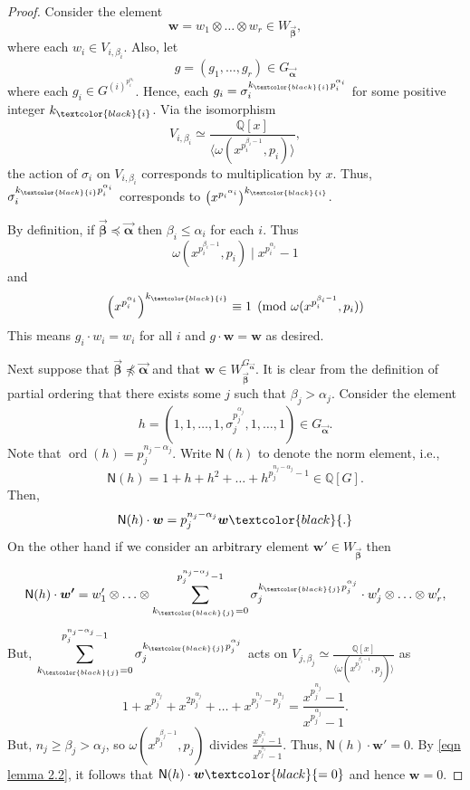 \documentclass{amsart}
\newcommand{\edit}[1]{\textcolor{black}{#1}}
\numberwithin{equation}{section}
\theoremstyle{remark}
\newcommand{\val}{\vec{\boldsymbol{\alpha}}}
\newcommand{\veb}{\vec{\boldsymbol{\beta}}}
\newcommand{\Q}{\mathbb{Q}}
\newcommand{\ord}{\operatorname{ord}}
\theoremstyle{plain} %
\begin{document}
\begin{proof}
Consider the element
\[
\boldsymbol{w} = w_1 \otimes \ldots \otimes w_r \in W_{\veb},
\]
where each $w_i \in V_{i, \beta_i}$.
Also, let 
\[
g = (g_1 , \ldots, g_r)\in G_{\val}
\]
where each $g_i \in G^{{(i)}^{p_i^{\alpha_i}}}$.
Hence, each $g_i = \sigma_i^{k_{\edit{i}}p_i^{\alpha_i}}$ for some positive integer $k_{\edit{i}}$.
Via the isomorphism
\[
V_{i,\beta_i} \simeq \frac{\Q[x]}{\langle \omega(x^{p_i^{\beta_i - 1}}, p_i) \rangle}, 
\]
the action of $\sigma_i$ on $V_{i,\beta_i}$ corresponds to multiplication by $x$.
Thus, $\sigma_i^{k_{\edit{i}}p_i^{\alpha_i}}$ corresponds to $\left(x^{{p_i}^{\alpha_i}}\right)^{k_{\edit{i}}}$.

By definition, if $\veb\preccurlyeq \val$ then $\beta_i \leq \alpha_i$ for each $i$.
Thus
\[
\omega(x^{p_i^{\beta_i - 1}}, p_i) \mid x^{p_i^{\alpha_i}} - 1
\]
and
\[
\left( x^{p_i^{\alpha_i}} \right)^{k_{\edit{i}} }\equiv 1 \pmod{\omega(x^{p_i^{\beta_i - 1}}, p_i)}
\]
This means $g_i \cdot w_i = w_i$ for all $i$ and $g \cdot \boldsymbol{w} = \boldsymbol{w}$ as desired.

Next suppose that $\veb\not\preccurlyeq \val$ and that $\boldsymbol{w}\in W_{\veb}^{G_{\val}}$.
It is clear from the definition of partial ordering that there exists some $j$ such that $\beta_j > \alpha_j$.
Consider the element
\[
h = (1, 1, \ldots, 1, \sigma_j^{p_j^{\alpha_j}}, 1, \ldots, 1)\in G_{\val}.
\]
Note that $\ord(h) = p_j^{n_j - \alpha_j}$.
Write $\mathsf{N}(h)$ to denote the norm element, i.e.,
\[
\mathsf{N}(h) = 1 + h + h^2 + \ldots + h^{p_j^{n_j - \alpha_j}-1} \in \Q[G].
\]
Then, 
\begin{equation}
\label{eqn lemma 2.2}
\mathsf{N}(h)\cdot \boldsymbol{w} = p_j^{n_j - \alpha_j}\boldsymbol{w} \edit{.}
\end{equation}
On the other hand if we consider \edit{an arbitrary} element $\boldsymbol{w'}\in W_{\veb}$ then
\[
\mathsf{N}(h)\cdot \boldsymbol{w'} = w'_1 \otimes \ldots \otimes \sum_{k_{\edit{j}}=0}^{p_j^{n_j - \alpha_j}-1} \sigma_j^{k_{\edit{j}} p_j^{\alpha_j}}\cdot w'_j\otimes \ldots \otimes w'_r ,
\]
But, $\displaystyle\sum_{k_{\edit{j}}=0}^{p_j^{n_j - \alpha_j}-1} \sigma_j^{k_{\edit{j}} p_j^{\alpha_j}}$ acts on $V_{j,\beta_j} \simeq \frac{\Q[x]}{\langle \omega(x^{p_j^{\beta_j - 1}}, p_j) \rangle}$ as
\[
1 + x^{p_j^{\alpha_j}} + x^{2p_j^{\alpha_j}} + \ldots + x^{p_j^{n_j} - p_j^{\alpha_j}} = \frac{x^{p_j^{n_j}}-1}{x^{p_j^{\alpha_j}}-1}.
\]
But, $n_j \geq \beta_j > \alpha_j$, so $\omega(x^{p_j^{\beta_j - 1}}, p_j)$ divides $\frac{x^{p_j^{n_j}}-1}{x^{p_j^{\alpha_j}}-1}$.
Thus, $\mathsf{N}(h)\cdot \boldsymbol{w'}=0$.
By \eqref{eqn lemma 2.2}, it follows that $\mathsf{N}(h)\cdot \boldsymbol{w}\edit{=0}$ and hence $\boldsymbol{w}=0$.
\end{proof}
\end{document}

